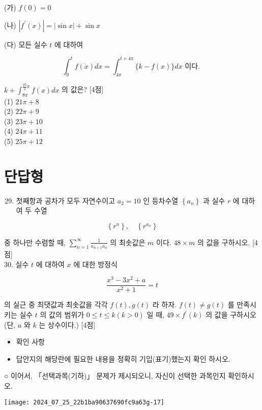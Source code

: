 \documentclass[10pt]{article}
\begin{document}
(가) $f(0)=0$

(나) $\left|f^{\prime}(x)\right|=|\sin x|+\sin x$

(다) 모든 실수 $t$ 에 대하여

\[
\int_{0}^{t} f(\dot{x}) d x=\int_{4 \pi}^{t+4 \pi}\{k-f(x)\} d x \text { 이다. }
\]

$k+\int_{8 \pi}^{\frac{25}{2} \pi} f(x) d x$ 의 값은? [4점]\\
(1) $21 \pi+8$\\
(2) $22 \pi+9$\\
(3) $23 \pi+10$\\
(4) $24 \pi+11$\\
(5) $25 \pi+12$

\section*{단답형}
\begin{enumerate}
  \setcounter{enumi}{28}
  \item 첫째항과 공차가 모두 자연수이고 $a_{2}=10$ 인 등차수열 $\left\{a_{n}\right\}$ 과 실수 $r$ 에 대하여 두 수열
\end{enumerate}

\[
\left\{r^{n}\right\}, \quad\left\{r^{a_{n}}\right\}
\]

중 하나만 수렴할 때, $\sum_{n=1}^{\infty} \frac{1}{a_{n+1} a_{n}}$ 의 최솟값은 $m$ 이다. $48 \times m$ 의 값을 구하시오. [4점]\\
30. 실수 $t$ 에 대하여 $x$ 에 대한 방정식

\[
\frac{x^{3}-3 x^{2}+a}{x^{2}+1}=t
\]

의 실근 중 최댓값과 최솟값을 각각 $f(t), g(t)$ 라 하자. $f(t) \neq g(t)$ 를 만족시키는 실수 $t$ 의 값의 범위가 $0 \leq t \leq k(k>0)$ 일 때, $49 \times f^{\prime}(k)$ 의 값을 구하시오 (단, $a$ 와 $k$ 는 상수이다.) [4점]

\begin{itemize}
  \item 확인 사항
\end{itemize}

\begin{itemize}
  \item 답안지의 해당란에 필요한 내용을 정확히 기입(표기)했는지 확인 하시오.
\end{itemize}

○ 이어서, 「선택과목(기하)」 문제가 제시되오니, 자신이 선택한 과목인지 확인하시오.

\begin{center}
\texttt{[image: 2024\_07\_25\_22b1ba90637690fc9a63g-17]}
\end{center}
\end{document}
